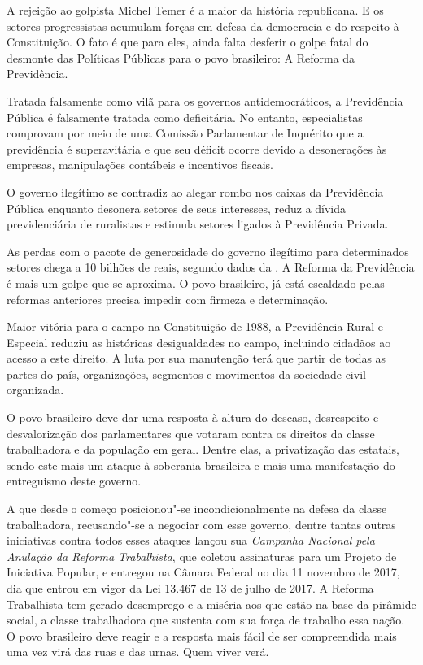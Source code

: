 A rejeição ao golpista Michel Temer é a maior da história republicana. E
os setores progressistas acumulam forças em defesa da democracia e do
respeito à Constituição. O fato é que para eles, ainda falta desferir o
golpe fatal do desmonte das Políticas Públicas para o povo brasileiro: A
Reforma da Previdência.

Tratada falsamente como vilã para os governos antidemocráticos, a
Previdência Pública é falsamente tratada como deficitária. No entanto,
especialistas comprovam por meio de uma Comissão Parlamentar de
Inquérito que a previdência é superavitária e que seu déficit ocorre
devido a desonerações às empresas, manipulações contábeis e incentivos
fiscais.

O governo ilegítimo se contradiz ao alegar rombo nos caixas da
Previdência Pública enquanto desonera setores de seus interesses, reduz
a dívida previdenciária de ruralistas e estimula setores ligados à
Previdência Privada.

As perdas com o pacote de generosidade do governo ilegítimo para
determinados setores chega a 10 bilhões de reais, segundo dados da .
A Reforma da Previdência é mais um golpe que se aproxima. O povo
brasileiro, já está escaldado pelas reformas anteriores precisa impedir
com firmeza e determinação.

Maior vitória para o campo na Constituição de 1988, a Previdência Rural
e Especial reduziu as históricas desigualdades no campo, incluindo
cidadãos ao acesso a este direito. A luta por sua manutenção terá que
partir de todas as partes do país, organizações, segmentos e movimentos
da sociedade civil organizada.

O povo brasileiro deve dar uma resposta à altura do descaso, desrespeito
e desvalorização dos parlamentares que votaram contra os direitos da
classe trabalhadora e da população em geral. Dentre elas, a privatização
das estatais, sendo este mais um ataque à soberania brasileira e mais
uma manifestação do entreguismo deste governo.

A  que desde o começo posicionou"-se incondicionalmente na defesa da classe trabalhadora, recusando"-se a negociar com esse governo, dentre tantas outras iniciativas contra todos esses ataques lançou sua \emph{Campanha Nacional pela Anulação da Reforma Trabalhista}, que coletou assinaturas para um Projeto de Iniciativa Popular, e entregou na Câmara Federal no dia 11 novembro de 2017, dia que entrou em vigor da Lei 13.467 de 13 de julho de 2017. A Reforma Trabalhista tem gerado desemprego e a miséria aos que estão na base da pirâmide social, a classe trabalhadora que sustenta com sua força de trabalho essa nação. O povo brasileiro deve reagir e a resposta mais fácil de ser compreendida mais uma vez virá das ruas e das urnas. Quem viver verá. 

